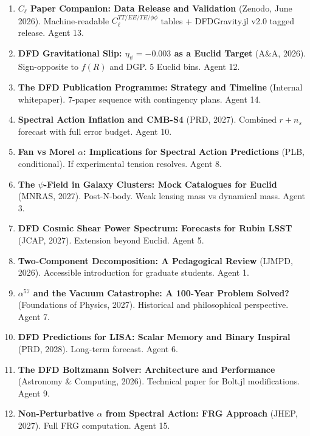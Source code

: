 \documentclass[11pt,a4paper]{article}
\begin{document}
\begin{enumerate}[nosep]
\item \textbf{$C_\ell$ Paper Companion: Data Release and Validation} (Zenodo, June 2026). Machine-readable $C_\ell^{TT/EE/TE/\phi\phi}$ tables + DFDGravity.jl v2.0 tagged release. Agent 13.

\item \textbf{DFD Gravitational Slip: $\eta_\psi = -0.003$ as a Euclid Target} (A\&A, 2026). Sign-opposite to $f(R)$ and DGP. 5 Euclid bins. Agent 12.

\item \textbf{The DFD Publication Programme: Strategy and Timeline} (Internal whitepaper). 7-paper sequence with contingency plans. Agent 14.

\item \textbf{Spectral Action Inflation and CMB-S4} (PRD, 2027). Combined $r + n_s$ forecast with full error budget. Agent 10.

\item \textbf{Fan vs Morel $\alpha$: Implications for Spectral Action Predictions} (PLB, conditional). If experimental tension resolves. Agent 8.

\item \textbf{The $\psi$-Field in Galaxy Clusters: Mock Catalogues for Euclid} (MNRAS, 2027). Post-N-body. Weak lensing mass vs dynamical mass. Agent 3.

\item \textbf{DFD Cosmic Shear Power Spectrum: Forecasts for Rubin LSST} (JCAP, 2027). Extension beyond Euclid. Agent 5.

\item \textbf{Two-Component Decomposition: A Pedagogical Review} (IJMPD, 2026). Accessible introduction for graduate students. Agent 1.

\item \textbf{$\alpha^{57}$ and the Vacuum Catastrophe: A 100-Year Problem Solved?} (Foundations of Physics, 2027). Historical and philosophical perspective. Agent 7.

\item \textbf{DFD Predictions for LISA: Scalar Memory and Binary Inspiral} (PRD, 2028). Long-term forecast. Agent 6.

\item \textbf{The DFD Boltzmann Solver: Architecture and Performance} (Astronomy \& Computing, 2026). Technical paper for Bolt.jl modifications. Agent 9.

\item \textbf{Non-Perturbative $\alpha$ from Spectral Action: FRG Approach} (JHEP, 2027). Full FRG computation. Agent 15.


\end{enumerate}
\end{document}
